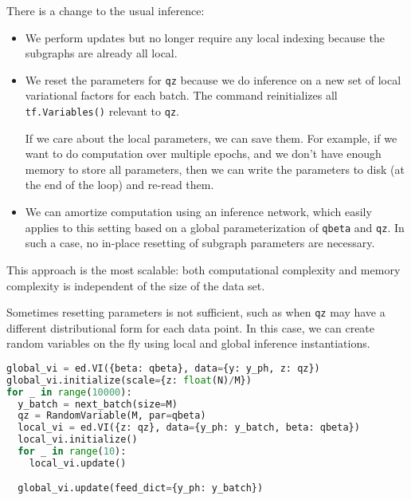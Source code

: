 There is a change to the usual inference:
\begin{itemize}
\item
  We perform updates but no longer require any local indexing because
  the subgraphs are already all local.
\item
  We reset the parameters for \texttt{qz} because we do inference on a new
  set of local variational factors for each batch. The command
  reinitializes all \texttt{tf.Variables()} relevant to \texttt{qz}.

  If we care about the local parameters, we can save them. For
  example, if we want to do computation over multiple epochs, and we
  don't have enough memory to store all parameters, then we can write
  the parameters to disk (at the end of the loop) and re-read them.
\item
  We can amortize computation using an inference network, which easily
  applies to this setting based on a global parameterization of
  \texttt{qbeta} and \texttt{qz}. In such a case, no in-place resetting of subgraph
  parameters are necessary.
\end{itemize}

This approach is the most scalable: both computational complexity and
memory complexity is independent of the size of the data set.

Sometimes resetting parameters is not sufficient, such as when \texttt{qz} may
have a different distributional form for each data point. In this
case, we can create random variables on the fly using
local and global inference instantiations.
\begin{lstlisting}[language=Python]
global_vi = ed.VI({beta: qbeta}, data={y: y_ph, z: qz})
global_vi.initialize(scale={z: float(N)/M})
for _ in range(10000):
  y_batch = next_batch(size=M)
  qz = RandomVariable(M, par=qbeta)
  local_vi = ed.VI({z: qz}, data={y_ph: y_batch, beta: qbeta})
  local_vi.initialize()
  for _ in range(10):
    local_vi.update()

  global_vi.update(feed_dict={y_ph: y_batch})
\end{lstlisting}

